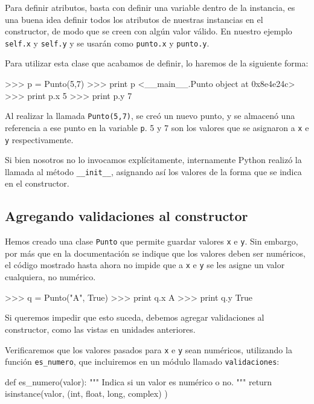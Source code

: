 Para definir atributos, basta con definir una variable dentro de la
instancia, es una buena idea definir todos los atributos de nuestras
instancias en el constructor, de modo que se creen con algún valor válido.
En nuestro ejemplo \lstinline!self.x! y \lstinline!self.y! y se usarán como
\lstinline!punto.x! y \lstinline!punto.y!.

Para utilizar esta clase que acabamos de definir, lo haremos de la
siguiente forma:

\begin{codigo-python-sn}
>>> p = Punto(5,7)
>>> print p
<__main__.Punto object at 0x8e4e24c>
>>> print p.x
5
>>> print p.y
7
\end{codigo-python-sn}

Al realizar la llamada \lstinline!Punto(5,7)!, se creó un nuevo punto, y se
almacenó una referencia a ese punto en la variable \lstinline!p!. 5 y 7 son
los valores que se asignaron a \lstinline!x! e \lstinline!y!
respectivamente.

Si bien nosotros no lo invocamos explícitamente, internamente Python
realizó la llamada al método \lstinline!__init__!, asignando así los
valores de la forma que se indica en el constructor.

\subsection{Agregando validaciones al constructor}

Hemos creado una clase \lstinline!Punto! que permite guardar valores
\lstinline!x! e \lstinline!y!.  Sin embargo, por más que en la
documentación se indique que los valores deben ser numéricos, el código
mostrado hasta ahora no impide que a \lstinline!x! e \lstinline!y! se les
asigne un valor cualquiera, no numérico.

\begin{codigo-python-sn}
>>> q = Punto("A", True)
>>> print q.x
A
>>> print q.y
True
\end{codigo-python-sn}

Si queremos impedir que esto suceda, debemos agregar validaciones al
constructor, como las vistas en unidades anteriores.

Verificaremos que los valores pasados para \lstinline!x! e \lstinline!y!
sean numéricos, utilizando la función \lstinline!es_numero!, que
incluiremos en un módulo llamado \lstinline!validaciones!:

\begin{codigo-python-sn}
def es_numero(valor):
    """ Indica si un valor es numérico o no. """
    return isinstance(valor, (int, float, long, complex) )
\end{codigo-python-sn}

